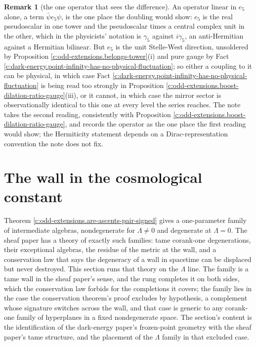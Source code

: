 \documentclass[11pt]{article}
\theoremstyle{definition}
\newtheorem{remark}[theorem]{Remark}
\theoremstyle{plain}
\begin{document}
\begin{remark}[the one operator that sees the difference]\label{c:note.odd-extensions.one-operator-sees-difference}
An operator linear in $e_{5}$ alone, a term $\bar\psi e_{5}\psi$, is the one place the doubling would show: $e_{5}$ is the real pseudoscalar in one tower and the pseudoscalar times a central complex unit in the other, which in the physicists' notation is $\gamma_{5}$ against $i\gamma_{5}$, an anti-Hermitian against a Hermitian bilinear. But $e_{5}$ is the unit Stelle-West direction, unsoldered by Proposition \ref{c:odd-extensions.belongs-tower}(i) and pure gauge by Fact \ref{c:dark-energy.point-infinity-has-no-physical-fluctuation}; so either a coupling to it can be physical, in which case Fact \ref{c:dark-energy.point-infinity-has-no-physical-fluctuation} is being read too strongly in Proposition \ref{c:odd-extensions.boost-dilation-ratio-gauge}(iii), or it cannot, in which case the mirror sector is observationally identical to this one at every level the series reaches. The note takes the second reading, consistently with Proposition \ref{c:odd-extensions.boost-dilation-ratio-gauge}, and records the operator as the one place the first reading would show; the Hermiticity statement depends on a Dirac-representation convention the note does not fix.
\end{remark}

\section{The wall in the cosmological constant}

\label{c:note.odd-extensions.setting-wall-cosmological-constant}
Theorem \ref{c:odd-extensions.are-ascents-pair-signed} gives a one-parameter family of intermediate algebras, nondegenerate for $\Lambda \neq 0$ and degenerate at $\Lambda = 0$. The sheaf paper has a theory of exactly such families: tame corank-one degenerations, their exceptional algebras, the residue of the metric at the wall, and a conservation law that says the degeneracy of a wall in spacetime can be displaced but never destroyed. This section runs that theory on the $\Lambda$ line. The family is a tame wall in the sheaf paper's sense, and the rung completes it on both sides, which the conservation law forbids for the completions it covers; the family lies in the case the conservation theorem's proof excludes by hypothesis, a complement whose signature switches across the wall, and that case is generic to any corank-one family of hyperplanes in a fixed nondegenerate space. The section's content is the identification of the dark-energy paper's frozen-point geometry with the sheaf paper's tame structure, and the placement of the $\Lambda$ family in that excluded case.
\end{document}

